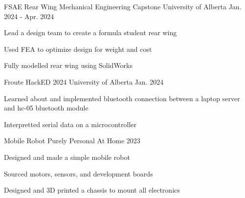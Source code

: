 

\begin{cventries}
  
  \cventry
  {FSAE Rear Wing} %
  {Mechanical Engineering Capstone} %
  {University of Alberta} %
  {Jan. 2024 - Apr. 2024} %
  {
    \begin{cvitems} %
      \item Lead a design team to create a formula student rear wing
      \item Used FEA to optimize design for weight and cost
      \item Fully modelled rear wing using SolidWorks 
    \end{cvitems}
  }
  
  \cventry
  {Froute} %
  {HackED 2024} %
  {University of Alberta} %
  {Jan. 2024} %
  {
    \begin{cvitems} %
      \item Learned about and implemented bluetooth connection between a laptop server and hc-05 bluetooth module
      \item Interpretted serial data on a microcontroller
    \end{cvitems}
    }
    
    \cventry
    {Mobile Robot} %
    {Purely Personal} %
    {At Home} %
    {2023} %
    {
    \begin{cvitems} %
      \item Designed and made a simple mobile robot
      \item Sourced motors, sensors, and development boards
      \item Designed and 3D printed a chassis to mount all electronics
    \end{cvitems}
    }
    

\end{cventries}
